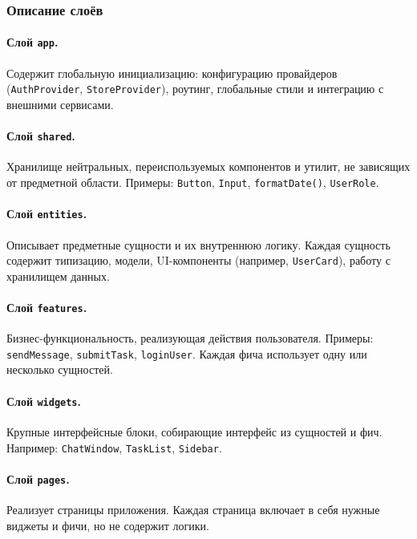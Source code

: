\subsubsection{Описание слоёв}

\paragraph{Слой \texttt{app}.}  
Содержит глобальную инициализацию: конфигурацию провайдеров (\texttt{AuthProvider}, \texttt{StoreProvider}), роутинг, глобальные стили и интеграцию с внешними сервисами.

\paragraph{Слой \texttt{shared}.}  
Хранилище нейтральных, переиспользуемых компонентов и утилит, не зависящих от предметной области. Примеры: \texttt{Button}, \texttt{Input}, \texttt{formatDate()}, \texttt{UserRole}.

\paragraph{Слой \texttt{entities}.}  
Описывает предметные сущности и их внутреннюю логику. Каждая сущность содержит типизацию, модели, UI-компоненты (например, \texttt{UserCard}), работу с хранилищем данных.

\paragraph{Слой \texttt{features}.}  
Бизнес-функциональность, реализующая действия пользователя. Примеры: \texttt{sendMessage}, \texttt{submitTask}, \texttt{loginUser}. Каждая фича использует одну или несколько сущностей.

\paragraph{Слой \texttt{widgets}.}  
Крупные интерфейсные блоки, собирающие интерфейс из сущностей и фич. Например: \texttt{ChatWindow}, \texttt{TaskList}, \texttt{Sidebar}.

\paragraph{Слой \texttt{pages}.}  
Реализует страницы приложения. Каждая страница включает в себя нужные виджеты и фичи, но не содержит логики.

